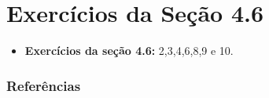 \documentclass[12pt]{beamer}
\begin{document}
\section{Exercícios da Seção 4.6}
\begin{frame}{\Home}
\begin{block}{}
\justifying

\begin{itemize}
    \item \textbf{Exercícios da seção 4.6:} 2,3,4,6,8,9 e 10.
\end{itemize}
\nocite{hogg}
\end{block}
\end{frame}

\begin{frame}[allowframebreaks]
\frametitle{\bf Referências}
\printbibliography
\end{frame}
\end{document}
